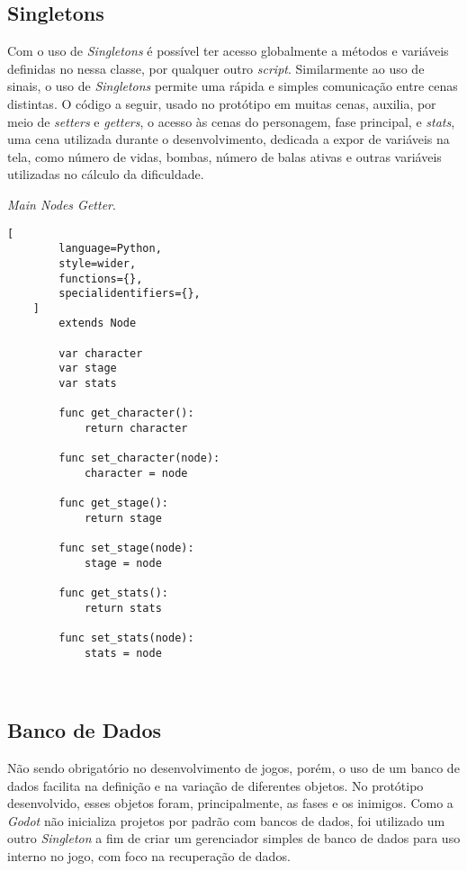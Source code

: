 \subsection{Singletons}\label{sec:Singletons}

Com o uso de \textit{Singletons} é possível ter acesso globalmente a métodos e variáveis definidas no nessa classe, por qualquer outro \textit{script}. Similarmente ao uso de sinais, o uso de \textit{Singletons} permite uma rápida e simples comunicação entre cenas distintas. O código a seguir, usado no protótipo em muitas cenas, auxilia, por meio de \textit{setters} e \textit{getters}, o acesso às cenas do personagem, fase principal, e \textit{stats}, uma cena utilizada durante o desenvolvimento, dedicada a expor de variáveis na tela, como número de vidas, bombas, número de balas ativas e outras variáveis utilizadas no cálculo da dificuldade.

\pagebreak

\begin{programruledcaption}{\textit{Main Nodes Getter}.\label{prog:main_nodes_getter}}
    \begin{lstlisting}[
        language=Python,
        style=wider,
        functions={},
        specialidentifiers={},
    ]
        extends Node

        var character
        var stage
        var stats
        
        func get_character():
            return character
        
        func set_character(node):
            character = node
        
        func get_stage():
            return stage
        
        func set_stage(node):
            stage = node
        
        func get_stats():
            return stats
        
        func set_stats(node):
            stats = node
        
    
    \end{lstlisting}
\end{programruledcaption}

\subsection{Banco de Dados}\label{BancoDeDados}

Não sendo obrigatório no desenvolvimento de jogos, porém, o uso de um banco de dados facilita na definição e na variação de diferentes objetos. No protótipo desenvolvido, esses objetos foram, principalmente, as fases e os inimigos. Como a \textit{Godot} não inicializa projetos por padrão com bancos de dados, foi utilizado um outro \textit{Singleton} a fim de criar um gerenciador simples de banco de dados para uso interno no jogo, com foco na recuperação de dados.

